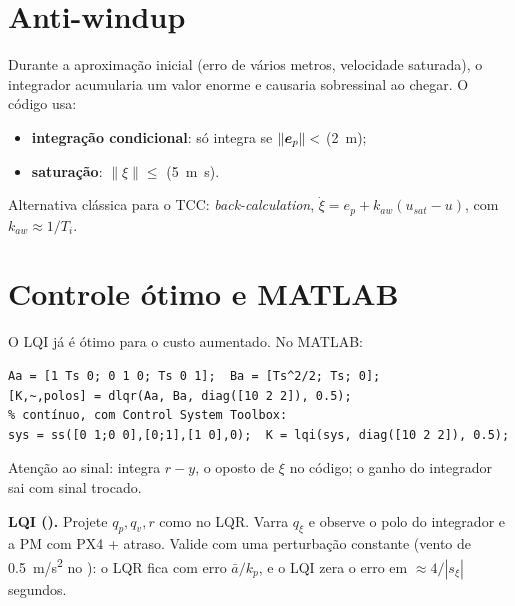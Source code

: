 \section{Anti-windup}
Durante a aproximação inicial (erro de vários metros, velocidade saturada), o
integrador acumularia um valor enorme e causaria sobressinal ao chegar. O código usa:
\begin{itemize}
  \item \textbf{integração condicional}: só integra se $\lVert\bm{e}_p\rVert<$
         (\SI{2}{m});
  \item \textbf{saturação}: $\lVert\xi\rVert\le$  (\SI{5}{m.s}).
\end{itemize}
Alternativa clássica para o TCC: \emph{back-calculation},
$\dot\xi = e_p + k_{aw}(u_{sat}-u)$, com $k_{aw}\approx 1/T_i$.

\section{Controle ótimo e MATLAB}
O LQI já é ótimo para o custo aumentado. No MATLAB:
\begin{lstlisting}
Aa = [1 Ts 0; 0 1 0; Ts 0 1];  Ba = [Ts^2/2; Ts; 0];
[K,~,polos] = dlqr(Aa, Ba, diag([10 2 2]), 0.5);
% contínuo, com Control System Toolbox:
sys = ss([0 1;0 0],[0;1],[1 0],0);  K = lqi(sys, diag([10 2 2]), 0.5);
\end{lstlisting}
Atenção ao sinal:  integra $r-y$, o oposto de $\xi$ no código; o ganho do
integrador sai com sinal trocado.

\begin{receita}
\textbf{LQI ().} Projete $q_p,q_v,r$ como no LQR. Varra
$q_\xi$ e observe o polo do integrador e a PM com PX4 + atraso. Valide com uma
perturbação constante (vento de \SI{0,5}{m/s^2} no ): o LQR fica
com erro $\bar a/k_p$, e o LQI zera o erro em $\approx 4/|s_\xi|$ segundos.
\end{receita}
